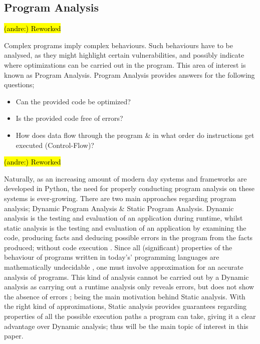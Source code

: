 \documentclass[12pt, a4paper]{report}
\DeclareRobustCommand{\andre}[1]{ {\begingroup\sethlcolor{BurntOrange}\hl{(andre:) #1}\endgroup} }
\theoremstyle{definition}
\theoremstyle{definition}%
\theoremstyle{definition}%
\theoremstyle{definition}%
\theoremstyle{definition}%
\theoremstyle{definition}%
\begin{document}
        \subsection{Program Analysis}
        \andre{Reworked}
        \par Complex programs imply complex behaviours. Such behaviours have to be analysed, as they might
        highlight certain vulnerabilities, and possibly indicate where optimizations can be carried out in the program.
        This area of interest is known as Program Analysis. Program Analysis provides answers for the following questions;
        \begin{itemize}
            \item Can the provided code be optimized?
            \item Is the provided code free of errors?
            \item How does data flow through the program \& in what order do instructions get executed (Control-Flow)?
        \end{itemize}
        \andre{Reworked}
        \par Naturally, as an increasing amount of modern day systems and frameworks are developed in Python, the need for properly conducting program analysis on these systems is ever-growing.
        There are two main approaches regarding program analysis; Dynamic Program Analysis \& Static Program Analysis. Dynamic analysis is the testing and evaluation of 
        an application during runtime, whilst static analysis is the testing and evaluation of an application by examining the code, producing facts and deducing
        possible errors in the program from the facts produced; without code execution \cite{intel2013analysis}. Since all (significant) properties of the 
        behaviour of programs written in today's' programming languages are mathematically undecidable \cite{rice1953classes}, one must involve approximation
        for an accurate analysis of programs. This kind of analysis cannot be carried out by a Dynamic analysis as carrying out a runtime
        analysis only reveals errors, but does not show the absence of errors \cite{moller2012static}; being the main motivation behind Static analysis. With the 
        right kind of approximations, Static analysis provides guarantees regarding properties of all the possible execution paths
        a program can take, giving it a clear advantage over Dynamic analysis; thus will be the main topic of interest in this paper. 
        
\end{document}

